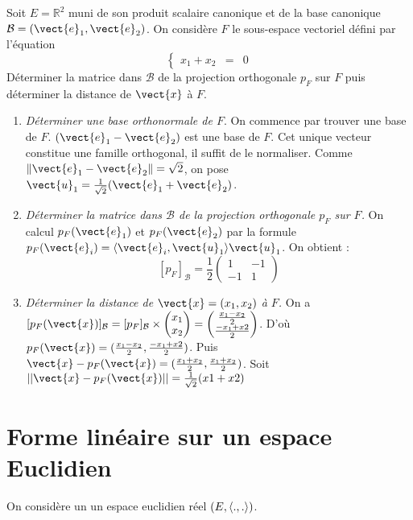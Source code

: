 \documentclass{book}
\begin{document}
\begin{Exemple}
Soit $E=\mathbb R^2$ muni de son produit scalaire canonique et de la base canonique $\mathcal B=(\vect{e}_1,\vect{e}_2)$. On considère $F$ le sous-espace vectoriel défini par l'équation 
$$\left\{
\begin{array}{rcl}
x_1+x_2&=&0
\end{array}
\right.
$$
Déterminer la matrice dans $\mathcal B$ de la projection orthogonale $p_F$ sur $F$ puis déterminer la distance de $\vect{x}$ à $F$.
\begin{enumerate}
\item \textit{Déterminer une base orthonormale de $F$}. On commence par trouver une base de $F$. $(\vect{e}_1-\vect{e}_2)$ est une base de $F$. Cet unique vecteur constitue  une famille orthogonal, il suffit de le normaliser. Comme $\norme{\vect{e}_1-\vect{e}_2}=\sqrt{2}$, on pose $\vect{u}_1=\frac{1}{\sqrt 2} (\vect{e}_1+\vect{e}_2)$.
\item \textit{Déterminer la matrice dans $\mathcal B$ de la projection orthogonale $p_F$ sur $F$.} On calcul $p_F(\vect{e}_1)$ et $p_F(\vect{e}_2)$ par la formule $p_F(\vect{e}_i)=\PS{\vect{e}_i}{\vect{u}_1}\vect{u}_1$. On obtient :
$$[p_F]_{\mathcal{B}}=\frac{1}{2}\begin{pmatrix}
1 & -1\\
-1 & 1
\end{pmatrix}
$$
\item \textit{Déterminer la distance de $\vect{x}=(x_1,x_2)$ à $F$.} On a  $[p_F(\vect{x})]_{\mathcal{B}} = [p_F]_{\mathcal{B}}\times \begin{pmatrix}
x_1\\
x_2
\end{pmatrix}= \begin{pmatrix}
\frac{x_1 -x_2}{2} \\
\frac{-x_1 +x2 }{2}
\end{pmatrix}$. D'où $p_F(\vect{x})=(\frac{x_1 -x_2}{2},
\frac{-x_1 +x2 }{2})$. Puis $\vect{x} - p_F(\vect{x})= (\frac{x_1 +x_2}{2},\frac{x_1 +x_2}{2})$. Soit $||\vect{x} - p_F(\vect{x})||=\frac{1}{\sqrt{2}}(x1+x2)$ 
\end{enumerate}

\end{Exemple}

\section{Forme linéaire sur un espace Euclidien}
On considère un un espace euclidien réel $(E,\langle.,.\rangle)$.
\end{document}
